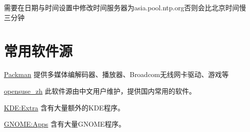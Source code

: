 \documentclass[10pt,openany]{book}
\begin{document}
需要在日期与时间设置中修改时间服务器为asia.pool.ntp.org否则会比北京时间慢三分钟

\section{常用软件源}


\begin{compactdesc}
 \item[\href{http://mirrors.hust.edu.cn/packman/suse/openSUSE_13.1/}{Packman}]
 提供多媒体编解码器、播放器、Broadcom无线网卡驱动、游戏等
 \item[\href{http://download.opensuse.org/repositories/home:/opensuse_zh/openSUSE_13.1/}{opensuse\_zh}]
 此软件源由中文用户维护，提供国内常用的软件。
 \item[\href{http://download.opensuse.org/repositories/KDE:/Extra/openSUSE_13.1/}{KDE:Extra}]
 含有大量额外的KDE程序。
 \item[\href{http://download.opensuse.org/repositories/GNOME:/Apps/openSUSE_13.1/}{GNOME:Apps}]
 含有大量GNOME程序。
\end{compactdesc}
\end{document}
